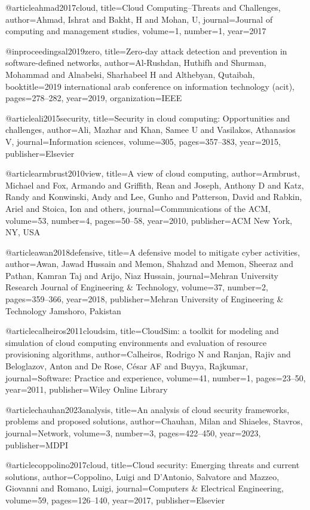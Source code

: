 @article{ahmad2017cloud,
title={Cloud Computing--Threats and Challenges},
author={Ahmad, Ishrat and Bakht, H and Mohan, U},
journal={Journal of computing and management studies},
volume={1},
number={1},
year={2017}
}

@inproceedings{al2019zero,
title={Zero-day attack detection and prevention in software-defined networks},
author={Al-Rushdan, Huthifh and Shurman, Mohammad and Alnabelsi, Sharhabeel H and Althebyan, Qutaibah},
booktitle={2019 international arab conference on information technology (acit)},
pages={278--282},
year={2019},
organization={IEEE}
}

@article{ali2015security,
title={Security in cloud computing: Opportunities and challenges},
author={Ali, Mazhar and Khan, Samee U and Vasilakos, Athanasios V},
journal={Information sciences},
volume={305},
pages={357--383},
year={2015},
publisher={Elsevier}
}

@article{armbrust2010view,
title={A view of cloud computing},
author={Armbrust, Michael and Fox, Armando and Griffith, Rean and Joseph, Anthony D and Katz, Randy and Konwinski, Andy and Lee, Gunho and Patterson, David and Rabkin, Ariel and Stoica, Ion and others},
journal={Communications of the ACM},
volume={53},
number={4},
pages={50--58},
year={2010},
publisher={ACM New York, NY, USA}
}

@article{awan2018defensive,
title={A defensive model to mitigate cyber activities},
author={Awan, Jawad Hussain and Memon, Shahzad and Memon, Sheeraz and Pathan, Kamran Taj and Arijo, Niaz Hussain},
journal={Mehran University Research Journal of Engineering \& Technology},
volume={37},
number={2},
pages={359--366},
year={2018},
publisher={Mehran University of Engineering \& Technology Jamshoro, Pakistan}
}

@article{calheiros2011cloudsim,
title={CloudSim: a toolkit for modeling and simulation of cloud computing environments and evaluation of resource provisioning algorithms},
author={Calheiros, Rodrigo N and Ranjan, Rajiv and Beloglazov, Anton and De Rose, C{\'e}sar AF and Buyya, Rajkumar},
journal={Software: Practice and experience},
volume={41},
number={1},
pages={23--50},
year={2011},
publisher={Wiley Online Library}
}

@article{chauhan2023analysis,
title={An analysis of cloud security frameworks, problems and proposed solutions},
author={Chauhan, Milan and Shiaeles, Stavros},
journal={Network},
volume={3},
number={3},
pages={422--450},
year={2023},
publisher={MDPI}
}

@article{coppolino2017cloud,
title={Cloud security: Emerging threats and current solutions},
author={Coppolino, Luigi and D’Antonio, Salvatore and Mazzeo, Giovanni and Romano, Luigi},
journal={Computers \& Electrical Engineering},
volume={59},
pages={126--140},
year={2017},
publisher={Elsevier}
}

